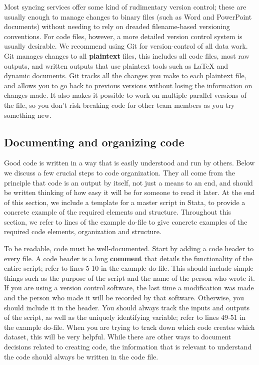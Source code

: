 Most syncing services offer some kind of rudimentary version control;
these are usually enough to manage changes to binary files (such as Word and PowerPoint documents)
without needing to rely on dreaded filename-based versioning conventions.
For code files, however, a more detailed version control system is usually desirable.
We recommend using Git for version-control of all data work.
Git manages changes to all \textbf{plaintext} files, 
this includes all code files, most raw outputs, 
and written outputs that use plaintext tools such as 
{\LaTeX} and dynamic documents.\index{{\LaTeX}} 
Git tracks all the changes you make to each plaintext file,
and allows you to go back to previous versions without losing the information on changes made.
It also makes it possible to work on multiple parallel versions of the file,
so you don't risk breaking code for other team members as you try something new.


\subsection{Documenting and organizing code}
Good code is written in a way that is easily understood and run by others.
Below we discuss a few crucial steps to code organization.
They all come from the principle that code is an output by itself,
not just a means to an end,
and should be written thinking of how easy it will be for someone to read it later.
At the end of this section, we include a template for a master script in Stata,
to provide a concrete example of the required elements and structure.
Throughout this section, we refer to lines of the example do-file
to give concrete examples of the required code elements, organization and structure.

To be readable, code must be well-documented.
Start by adding a code header to every file.
A code header is a long \textbf{comment}
that details the functionality of the entire script;
refer to lines 5-10 in the example do-file.
This should include simple things such as
the purpose of the script and the name of the person who wrote it.
If you are using a version control software,
the last time a modification was made and the person who made it will be recorded by that software.
Otherwise, you should include it in the header.
You should always track the inputs and outputs of the script, 
as well as the uniquely identifying variable;
refer to lines 49-51 in the example do-file.
When you are trying to track down which code creates which dataset, this will be very helpful.
While there are other ways to document decisions related to creating code,
the information that is relevant to understand the code should always be written in the code file.

